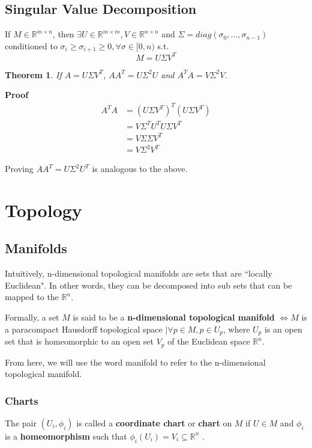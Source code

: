 \documentclass[12pt]{report}
\newtheorem{theorem}{Theorem}[section]
\begin{document}
\subsection{Singular Value Decomposition}
\label{sec:svd}
If $M \in \mathbb{R}^{m \times n}$, then $\exists U \in \mathbb{R}^{m \times m}, V \in \mathbb{R}^{n \times n}$ and $\Sigma =  diag(\sigma_0, \dots, \sigma_{n-1})$ conditioned to $\sigma_i \ge \sigma_{i+1} \ge 0, \forall \sigma \in [0, n)$ s.t. \cite{gan2008}
$$M = U\Sigma V^T$$

\begin{theorem}
	\label{th:svd-aat}
	If $A = U \Sigma V^T$, $AA^T = U \Sigma^2 U$ and $A^TA = V \Sigma^2 V$.
\end{theorem}
\textbf{Proof}
\begin{align*}
	A^TA &= (U\Sigma V^T)^T(U\Sigma V^T) \\
	&= V \Sigma^T U^T U \Sigma V^T \\
	&= V \Sigma \Sigma V^T \\
	&= V \Sigma^2 V^T
\end{align*}

Proving $AA^T = U \Sigma^2 U^T$ is analogous to the above.

\section{Topology}
\subsection{Manifolds}

Intuitively, n-dimensional topological manifolds are sets that are ``locally Euclidean". \cite{lee2009} In other words, they can be decomposed into sub sets that can be mapped to the $\mathbb{R}^n$.

Formally, a set $M$ is said to be a \textbf{n-dimensional topological manifold} $\iff M$ is a paracompact Hausdorff topological space $\mid \forall p \in M, p \in U_p$, where $U_p$ is an open set that is homeomorphic to an open set $V_p$ of the Euclidean space $\mathbb{R}^n$. \cite{lee2009}

From here, we will use the word manifold to refer to the n-dimensional topological manifold.

\subsubsection{Charts}
The pair $(U_i, \phi_i)$ is called a \textbf{coordinate chart} or \textbf{chart} on $M$ if $U \in M$ and $\phi_i$ is a \textbf{homeomorphism} such that $\phi_i(U_i) = V_i \subseteq \mathbb{R}^n$ \cite{lee2012}.
\end{document}
